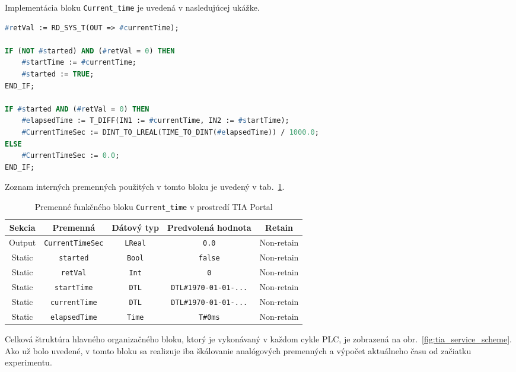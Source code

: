 Implementácia bloku \texttt{Current\_time} je uvedená v nasledujúcej ukážke.

\begin{lstlisting}[language=Pascal,
caption={Implementácia funkčného bloku \texttt{Current\_time}},
label={lst:current_time_fb}]
#retVal := RD_SYS_T(OUT => #currentTime);

IF (NOT #started) AND (#retVal = 0) THEN
    #startTime := #currentTime;
    #started := TRUE;
END_IF;

IF #started AND (#retVal = 0) THEN
    #elapsedTime := T_DIFF(IN1 := #currentTime, IN2 := #startTime);
    #CurrentTimeSec := DINT_TO_LREAL(TIME_TO_DINT(#elapsedTime)) / 1000.0;
ELSE
    #CurrentTimeSec := 0.0;
END_IF;
\end{lstlisting}
Zoznam interných premenných použitých v tomto bloku je uvedený v tab.~\ref{tab:tia_time_vars}.

\begin{table}[b!]
    \centering
    \caption{Premenné funkčného bloku \texttt{Current\_time} v prostredí TIA Portal}
    \label{tab:tia_time_vars}
    \begin{tabular*}{\textwidth}{@{\extracolsep{\fill}}c c c c c}
        \textbf{Sekcia} & \textbf{Premenná} & \textbf{Dátový typ} & \textbf{Predvolená hodnota} & \textbf{Retain} \\ \toprule
        Output & \texttt{CurrentTimeSec} & \texttt{LReal} & \texttt{0.0} & Non-retain \\ \midrule
        Static & \texttt{started} & \texttt{Bool} & \texttt{false} & Non-retain \\ \midrule
        Static & \texttt{retVal} & \texttt{Int} & \texttt{0} & Non-retain \\ \midrule
        Static & \texttt{startTime} & \texttt{DTL} & \texttt{DTL\#1970-01-01-...} & Non-retain \\ \midrule
        Static & \texttt{currentTime} & \texttt{DTL} & \texttt{DTL\#1970-01-01-...} & Non-retain \\ \midrule
        Static & \texttt{elapsedTime} & \texttt{Time} & \texttt{T\#0ms} & Non-retain \\ \bottomrule
    \end{tabular*}
\end{table}

Celková štruktúra hlavného organizačného bloku, ktorý je vykonávaný v každom
cykle PLC, je zobrazená na obr.~\ref{fig:tia_service_scheme}. Ako už bolo uvedené,
v tomto bloku sa realizuje iba škálovanie analógových premenných a výpočet
aktuálneho času od začiatku experimentu.


